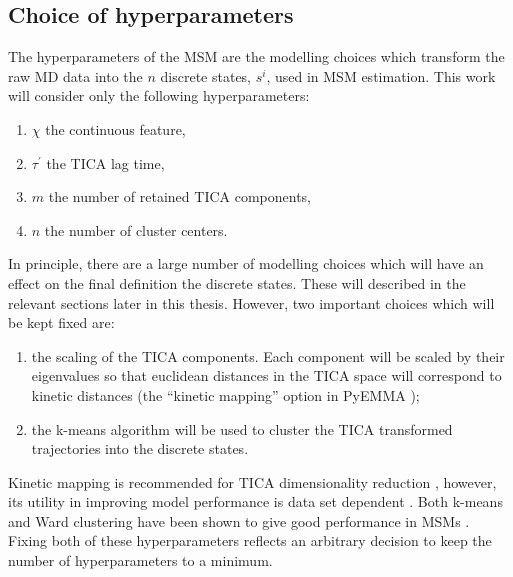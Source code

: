 \subsection{Choice of hyperparameters}\label{sec:theory_choice_hyp}
The hyperparameters of the MSM are the modelling choices which transform the raw MD data into the $n$ discrete states, $s^{i}$, used in MSM estimation. This work will consider only the following hyperparameters: 
\begin{enumerate}
    \item $\chi$ the continuous feature,
    \item $\tau^{\prime}$ the TICA lag time, 
    \item $m$ the number of retained TICA components, 
    \item $n$ the number of cluster centers. 
\end{enumerate}
In principle, there are a large number of modelling choices which will have an effect on the final definition the discrete states. These will described in the relevant sections later in this thesis. However, two important choices which will be kept fixed are: 
\begin{enumerate}
    \item the scaling of the TICA components. Each component will be scaled by their eigenvalues  so that euclidean distances in the TICA space will correspond to kinetic distances \cite{noeKineticDistanceKinetic2015} (the ``kinetic mapping'' option in PyEMMA \cite{schererPyEMMASoftwarePackage2015a});
    \item the k-means \cite{lloydLeastSquaresQuantization1982} algorithm will be used to cluster the TICA transformed trajectories into the discrete states. 
\end{enumerate}
Kinetic mapping is recommended for TICA dimensionality reduction \cite{noeKineticDistanceKinetic2015}, however, its utility in improving model performance is data set dependent \cite{husicOptimizedParameterSelection2016}.  Both k-means and Ward clustering have been shown to give good performance in MSMs \cite{husicWardClusteringImproves2017a}. Fixing both of these hyperparameters reflects an arbitrary decision to keep the number of hyperparameters to a minimum.

